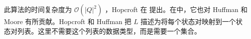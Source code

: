此算法的时间复杂度为 $\mathcal{O}(|Q|^2)$ ，Hopcroft 在 \cite[Fig.3.8]{Hu79} 提出。在\cite{Hu79}中，它也对 Huffman \cite{Huff54} 和 Moore \cite{Moor56} 有所贡献。Hopcroft 和 Huffman 把 $L$ 描述为将每个状态对映射到一个状态对列表。这里不需要这个列表的数据类型，而是需要一个集合。

